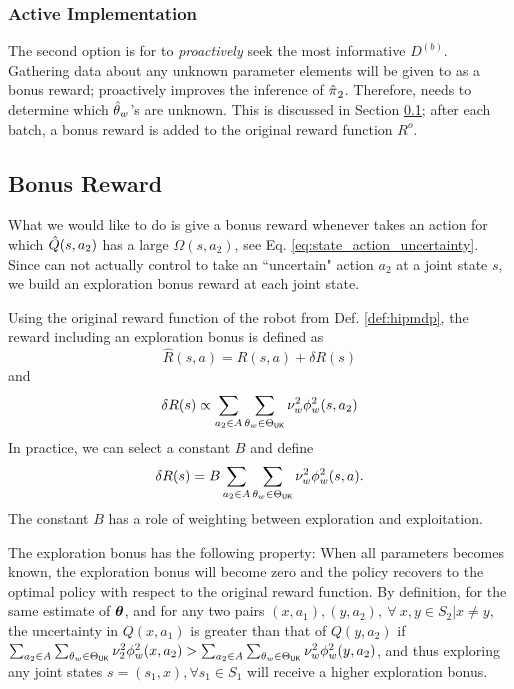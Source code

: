 	\subsubsection{Active Implementation}
     The second option is for  to \textit{proactively} seek the most informative $D^{(b)}$.  Gathering data
     about any unknown parameter elements will be given to  as a bonus reward;  proactively improves
     the inference of $\hat{\pi_{}}_2$. Therefore,  needs to determine which
     $\hat{\theta}_{w}$\!'s are unknown. This is discussed in Section \ref{sec:bonus_reward}; after each batch, a bonus reward is added to the original reward function $R^{o}$.


\subsection{Bonus Reward}\label{sec:bonus_reward}


    What we would like to do is give  a bonus reward whenever  takes an action for which
    $\hat{Q}(s,a_2)$ has a large $\Omega(s,a_2)$, see Eq. \ref{eq:state_action_uncertainty}. Since  can not actually control  to take an
    ``uncertain" action $a_2$ at a joint state $s$, we build an exploration bonus reward at each joint state.

    Using the original reward function of the robot from Def. \ref{def:hipmdp}, the reward including an exploration
    bonus is defined as
    \[
    \hat R (s,a) = R(s,a) + \delta R(s)
    \]
    and
    \[\delta R(s)  \propto \sum_{a_2\in A}\sum_{\theta_w\in \Theta_{\mathsf{UK}}} \nu_w^2 \phi^2_w(s,a_2)
    \]
    In practice, we can select a constant $B$ and define
    \begin{equation}\label{eq:bonus_reward}
    \delta R(s) = B \sum_{a_2\in A}\sum_{\theta_w\in \Theta_{\mathsf{UK}}} \nu_w^2 \phi_w^2(s,a).
    \end{equation}
    The constant $B$ has a role of weighting between exploration and exploitation.

    \par
    The exploration bonus has the following property: When all parameters becomes known, the exploration bonus will
    become zero and the policy recovers to the optimal policy with respect to the original reward function. By
    definition, for the same estimate of  $\boldsymbol{\mathbb{\theta}}$, and for any two pairs $(x,a_1), (y,a_2),\ \forall\ x,y\in S_2 | x
    \neq y$, the uncertainty in $Q(x,a_1)$ is greater than that of $Q(y,a_2)$ if $\sum_{a_2\in A}\sum_{\theta_w\in
    \Theta_{\mathsf{UK}}} \nu_2^2 \phi^2_w(x,a_2) > \sum_{a_2\in A}\sum_{\theta_w\in \Theta_{\mathsf{UK}}}  \nu_w^2
    \phi^2_w(y,a_2)  $, and thus exploring any joint states $s=(s_1,x), \forall s_1 \in S_1$ will receive a higher
    exploration bonus.


